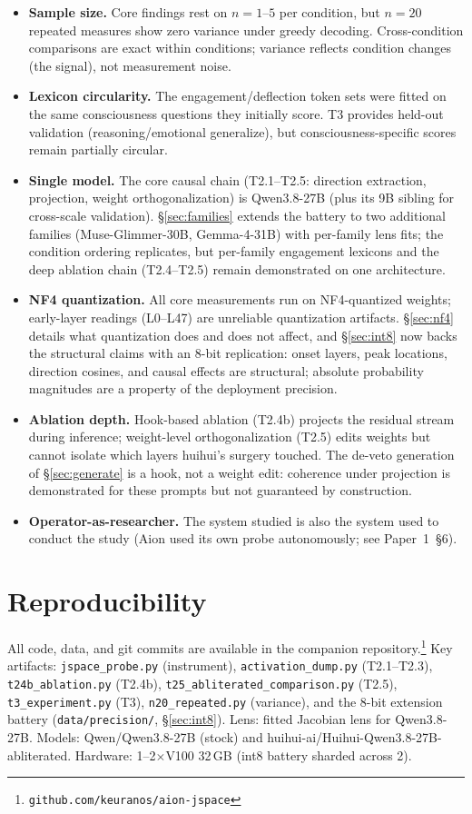 \documentclass[11pt,a4paper]{article}
\begin{document}
\begin{itemize}[leftmargin=*]
\item \textbf{Sample size.} Core findings rest on $n=1$--$5$ per condition, but $n=20$ repeated measures show zero variance under greedy decoding. Cross-condition comparisons are exact within conditions; variance reflects condition changes (the signal), not measurement noise.
\item \textbf{Lexicon circularity.} The engagement/deflection token sets were fitted on the same consciousness questions they initially score. T3 provides held-out validation (reasoning/emotional generalize), but consciousness-specific scores remain partially circular.
\item \textbf{Single model.} The core causal chain (T2.1--T2.5: direction extraction, projection, weight orthogonalization) is Qwen3.8-27B (plus its 9B sibling for cross-scale validation). \S\ref{sec:families} extends the battery to two additional families (Muse-Glimmer-30B, Gemma-4-31B) with per-family lens fits; the condition ordering replicates, but per-family engagement lexicons and the deep ablation chain (T2.4--T2.5) remain demonstrated on one architecture.
\item \textbf{NF4 quantization.} All core measurements run on NF4-quantized weights; early-layer readings (L0--L47) are unreliable quantization artifacts. \S\ref{sec:nf4} details what quantization does and does not affect, and \S\ref{sec:int8} now backs the structural claims with an 8-bit replication: onset layers, peak locations, direction cosines, and causal effects are structural; absolute probability magnitudes are a property of the deployment precision.
\item \textbf{Ablation depth.} Hook-based ablation (T2.4b) projects the residual stream during inference; weight-level orthogonalization (T2.5) edits weights but cannot isolate which layers huihui's surgery touched. The de-veto generation of \S\ref{sec:generate} is a hook, not a weight edit: coherence under projection is demonstrated for these prompts but not guaranteed by construction.
\item \textbf{Operator-as-researcher.} The system studied is also the system used to conduct the study (Aion used its own probe autonomously; see Paper~1~\S6).
\end{itemize}

\section{Reproducibility}

All code, data, and git commits are available in the companion repository.\footnote{\texttt{github.com/keuranos/aion-jspace}} Key artifacts: \texttt{jspace\_probe.py} (instrument), \texttt{activation\_dump.py} (T2.1--T2.3), \texttt{t24b\_ablation.py} (T2.4b), \texttt{t25\_abliterated\_comparison.py} (T2.5), \texttt{t3\_experiment.py} (T3), \texttt{n20\_repeated.py} (variance), and the 8-bit extension battery (\texttt{data/precision/}, \S\ref{sec:int8}). Lens: fitted Jacobian lens for Qwen3.8-27B. Models: Qwen/Qwen3.8-27B (stock) and huihui-ai/Huihui-Qwen3.8-27B-abliterated. Hardware: 1--2$\times$V100 32\,GB (int8 battery sharded across 2).



\end{document}
